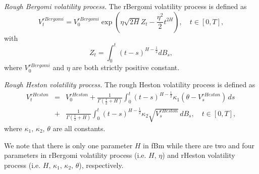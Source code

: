 \documentclass[]{article}
\renewcommand{\(}{\left(}
\renewcommand{\)}{\right)}
\begin{document}
	\textit{Rough Bergomi volatility process.} The rBergomi volatility process is defined as
	\begin{equation}
		\label{eq-rBergomi}
		V_t^{rBergomi} = V_0^{rBergomi} \exp \left(\eta\sqrt{2H}Z_t - \frac{\eta^2}{2} t^{2H}\right),\quad t\in[0,T],
	\end{equation}
	with
	\begin{equation}
		\label{eq-fBm2}
		Z_t = \int_{0}^{t} (t-s)^{H-\frac{1}{2}} dB_s,
	\end{equation}
	where $V_0^{rBergomi}$ and $\eta$ are both strictly positive constant.
	
	\textit{Rough Heston volatility process.} The rough Heston volatility process is defined as
	\begin{eqnarray}
		\label{eq-rHeston}
		V_t^{rHeston} &=& V_0^{rHeston} + \frac{1}{\Gamma\(\frac{1}{2}+H\)}\int_0^t(t-s)^{H-\frac{1}{2}} \kappa_1 (\theta-V_s^{rHeston})\,ds \nonumber\\
		&+& \frac{1}{\Gamma\(\frac{1}{2}+H\)}\int_0^t\(t-s\)^{H-\frac{1}{2}} \kappa_2 \sqrt{V_s^{rHeston}}\,dB_s,\quad t\in[0,T],
	\end{eqnarray}
	where $\kappa_1,\,\kappa_2,\,\theta$ are all constants.
	
	We note that there is only one parameter $H$ in fBm while there are two and four parameters in rBergomi volatility process (i.e. $H,\,\eta$) and rHeston volatility process (i.e. $H,\,\kappa_1,\,\kappa_2,\,\theta$), respectively.
	
\end{document}
